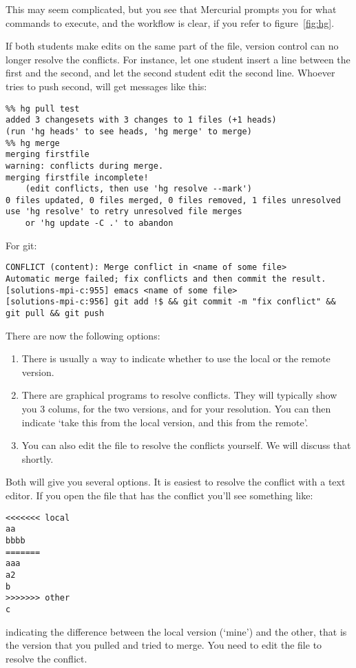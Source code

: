 This may seem complicated, but you see that Mercurial prompts you 
for what commands to execute, and the workflow is clear, if you refer
to figure~\ref{fig:hg}.


If both students make edits on the same part of the file, version
control can no
longer resolve the conflicts. For instance, let one student insert a
line between the first and the second, and let the second student edit
the second line. Whoever tries to push second, will get messages
like this:
{\small
\begin{verbatim}
%% hg pull test
added 3 changesets with 3 changes to 1 files (+1 heads)
(run 'hg heads' to see heads, 'hg merge' to merge)
%% hg merge
merging firstfile
warning: conflicts during merge.
merging firstfile incomplete! 
    (edit conflicts, then use 'hg resolve --mark')
0 files updated, 0 files merged, 0 files removed, 1 files unresolved
use 'hg resolve' to retry unresolved file merges 
    or 'hg update -C .' to abandon
\end{verbatim}
}

For git:
\begin{verbatim}
CONFLICT (content): Merge conflict in <name of some file>
Automatic merge failed; fix conflicts and then commit the result.
[solutions-mpi-c:955] emacs <name of some file>
[solutions-mpi-c:956] git add !$ && git commit -m "fix conflict" && git pull && git push
\end{verbatim}

There are now the following options:
\begin{enumerate}
\item There is usually a way to indicate whether to use the local or
  the remote version.
\item There are graphical programs to resolve conflicts. They will
  typically show you 3 colums, for the two versions, and for your
  resolution. You can then indicate `take this from the local version,
  and this from the remote'.
\item You can also edit the file to resolve the conflicts yourself. We
  will discuss that shortly.
\end{enumerate}

Both  will give you several options. It is easiest to resolve the
conflict with a text editor. If you open the file that has the conflict
you'll see something like:
\begin{verbatim}
<<<<<<< local
aa
bbbb
=======
aaa
a2
b
>>>>>>> other
c
\end{verbatim}
indicating the difference between the local version (`mine') and the
other, that is the version that you pulled and tried to merge.
You need to edit the file to resolve the conflict.

